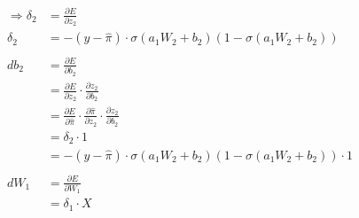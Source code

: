 \begin{align*}
\Rightarrow \delta_{2} &= \frac{\partial E}{\partial z_{2}}\\
\delta_{2} &= -(y-\hat{\pi}) \cdot \sigma(a_{1}W_{2}+b_{2})(1-\sigma(a_{1}W_{2}+b_{2}))\\\\
db_{2} &= \frac{\partial E}{\partial b_{2}}\\
&=\frac{\partial E}{\partial z_{2}} \cdot \frac{\partial z_{2}}{\partial b_{2}}\\
&= \frac{\partial E}{\partial\hat{\pi}} \cdot \frac{\partial \hat{\pi}}{\partial z_{2}} \cdot \frac{\partial z_{2}}{\partial b_{2}}\\
&= \delta_{2} \cdot 1\\
&= -(y-\hat{\pi}) \cdot \sigma(a_{1}W_{2}+b_{2})(1-\sigma(a_{1}W_{2}+b_{2})) \cdot 1\\\\
dW_{1} &= \frac{\partial E}{\partial W_{1}}\\
&= \delta_{1} \cdot X
\end{align*}
